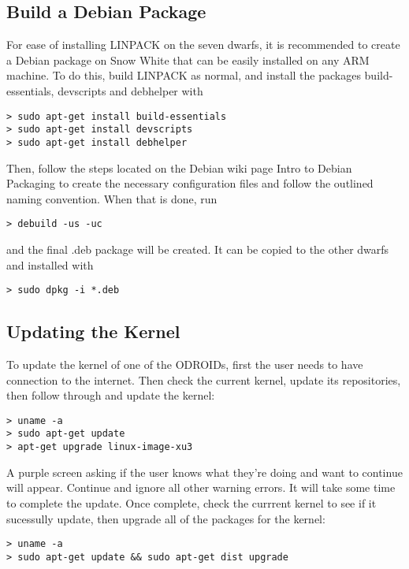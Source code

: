 \subsection{Build a Debian Package}

For ease of installing LINPACK on the seven dwarfs, it is recommended to create a Debian package on Snow White that can be easily installed on any ARM machine. To do this, build LINPACK as normal, and install the packages build-essentials, devscripts and debhelper with

\begin{lstlisting}
> sudo apt-get install build-essentials
> sudo apt-get install devscripts
> sudo apt-get install debhelper
\end{lstlisting}

Then, follow the steps located on the Debian wiki page Intro to Debian Packaging to create the necessary configuration files and follow the outlined naming convention. When that is done, run

\begin{lstlisting}
> debuild -us -uc
\end{lstlisting}

and the final .deb package will be created. It can be copied to the other dwarfs and installed with

\begin{lstlisting}
> sudo dpkg -i *.deb
\end{lstlisting}

\subsection{Updating the Kernel}
To update the kernel of one of the ODROIDs, first the user needs to have connection to the internet. Then check the current kernel, update its repositories, then follow through and update the kernel:
\begin{lstlisting}
> uname -a
> sudo apt-get update
> apt-get upgrade linux-image-xu3
\end{lstlisting}
A purple screen asking if the user knows what they're doing and want to continue will appear. Continue and ignore all other warning errors. It will take some time to complete the update. Once complete, check the currrent kernel to see if it sucessully update, then upgrade all of the packages for the kernel:
\begin{lstlisting}
> uname -a
> sudo apt-get update && sudo apt-get dist upgrade
\end{lstlisting}

